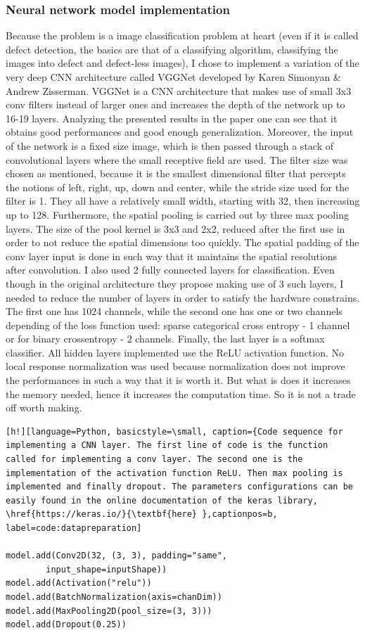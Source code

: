 \documentclass[12pt,a4paper,twoside]{report}
\begin{document}
\subsubsection{Neural network model implementation}
Because the problem is a image classification problem at heart (even if it is called defect detection, the basics are that of a classifying algorithm, classifying the images into defect and defect-less images), I chose to implement a variation of the very deep CNN architecture called VGGNet developed by Karen Simonyan \& Andrew Zisserman\cite{article-vgg}.
VGGNet is a CNN architecture that makes use of small 3x3 conv filters instead of larger ones and increases the depth of the network up to 16-19 layers. Analyzing the presented results in the paper one can see that it obtains good performances and good enough generalization. Moreover, the input of the network is a fixed size image, which is then passed through a stack of convolutional layers where the small receptive field are used. The filter size was chosen as mentioned, because it is the smallest dimensional filter that percepts the notions of left, right, up, down and center, while the stride size used for the filter is 1. They all have a relatively small width, starting with 32, then increasing up to 128. Furthermore, the spatial pooling is carried out by three max pooling layers. The size of the pool kernel is 3x3 and 2x2, reduced after the first use in order to not reduce the spatial dimensions too quickly. The spatial padding of the conv layer input is done in such way that it maintains the spatial resolutions after convolution. I also used 2 fully connected layers for classification. Even though in the original architecture they propose making use of 3 such layers, I needed to reduce the number of layers in order to satisfy the hardware constrains. The first one has 1024 channels, while the second one has one or two channels depending of the loss function used: sparse categorical cross entropy - 1 channel or for binary crossentropy - 2 channels. Finally, the last layer is a softmax classifier. All hidden layers implemented use the ReLU activation function. No local response normalization was used because normalization does not improve the performances in such a way that it is worth it. But what is does it increases the memory needed, hence it increases the computation time. So it is not a trade off worth making.

\begin{lstlisting}[h!][language=Python, basicstyle=\small, caption={Code sequence for implementing a CNN layer. The first line of code is the function called for implementing a conv layer. The second one is the implementation of the activation function ReLU. Then max pooling is implemented and finally dropout. The parameters configurations can be easily found in the online documentation of the keras library, \href{https://keras.io/}{\textbf{here} },captionpos=b, label=code:datapreparation]

model.add(Conv2D(32, (3, 3), padding="same",
		input_shape=inputShape))
model.add(Activation("relu"))
model.add(BatchNormalization(axis=chanDim))
model.add(MaxPooling2D(pool_size=(3, 3)))
model.add(Dropout(0.25))
 
\end{lstlisting}
\end{document}
